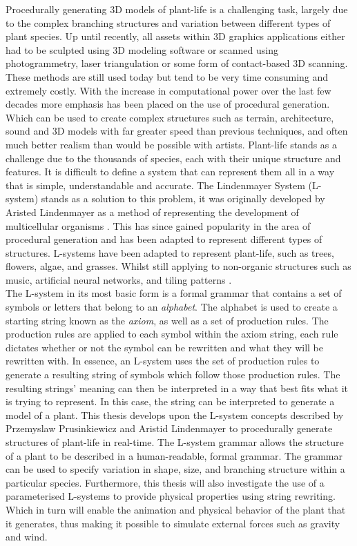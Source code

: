 \lettrine[lines=3]{P}{}rocedurally generating 3D models of plant-life is a challenging task, largely due to the complex branching structures and variation between different types of plant species. Up until recently, all assets within 3D graphics applications either had to be sculpted using 3D modeling software or scanned using photogrammetry, laser triangulation or some form of contact-based 3D scanning. These methods are still used today but tend to be very time consuming and extremely costly. With the increase in computational power over the last few decades more emphasis has been placed on the use of procedural generation. Which can be used to create complex structures such as terrain, architecture, sound and 3D models with far greater speed than previous techniques, and often much better realism than would be possible with artists. Plant-life stands as a challenge due to the thousands of species, each with their unique structure and features. It is difficult to define a system that can represent them all in a way that is simple, understandable and accurate. The Lindenmayer System (L-system) stands as a solution to this problem, it was originally developed by Aristed Lindenmayer as a method of representing the development of multicellular organisms \cite{lindenmayer1968mathematical}. This has since gained popularity in the area of procedural generation and has been adapted to represent different types of structures. L-systems have been adapted to represent plant-life, such as trees, flowers, algae, and grasses. Whilst still applying to non-organic structures such as music, artificial neural networks, and tiling patterns \cite{Prusinkiewicz1989}.\\

The L-system in its most basic form is a formal grammar that contains a set of symbols or letters that belong to an \textit{alphabet}. The alphabet is used to create a starting string known as the \textit{axiom}, as well as a set of production rules. The production rules are applied to each symbol within the axiom string, each rule dictates whether or not the symbol can be rewritten and what they will be rewritten with. In essence, an L-system uses the set of production rules to generate a resulting string of symbols which follow those production rules. The resulting strings' meaning can then be interpreted in a way that best fits what it is trying to represent. In this case, the string can be interpreted to generate a model of a plant. This thesis develops upon the L-system concepts described by Przemyslaw Prusinkiewicz and Aristid Lindenmayer to procedurally generate structures of plant-life in real-time. The L-system grammar allows the structure of a plant to be described in a human-readable, formal grammar. The grammar can be used to specify variation in shape, size, and branching structure within a particular species. Furthermore, this thesis will also investigate the use of a parameterised L-systems to provide physical properties using string rewriting. Which in turn will enable the animation and physical behavior of the plant that it generates, thus making it possible to simulate external forces such as gravity and wind.\\

